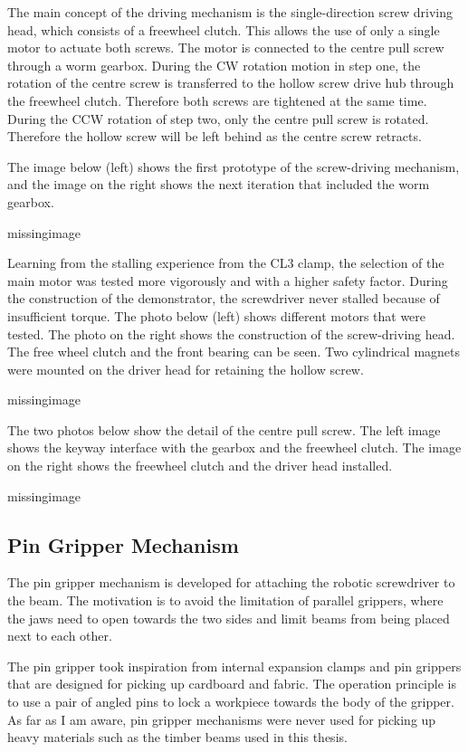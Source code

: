 The main concept of the driving mechanism is the single-direction screw driving head, which consists of a freewheel clutch. This allows the use of only a single motor to actuate both screws. The motor is connected to the centre pull screw through a worm gearbox. During the CW rotation motion in step one, the rotation of the centre screw is transferred to the hollow screw drive hub through the freewheel clutch. Therefore both screws are tightened at the same time. During the CCW rotation of step two, only the centre pull screw is rotated. Therefore the hollow screw will be left behind as the centre screw retracts.

The image below (left) shows the first prototype of the screw-driving mechanism, and the image on the right shows the next iteration that included the worm gearbox. 

missingimage

Learning from the stalling experience from the CL3 clamp, the selection of the main motor was tested more vigorously and with a higher safety factor. During the construction of the demonstrator, the screwdriver never stalled because of insufficient torque. The photo below (left) shows different motors that were tested. The photo on the right shows the construction of the screw-driving head. The free wheel clutch and the front bearing can be seen. Two cylindrical magnets were mounted on the driver head for retaining the hollow screw.

missingimage

The two photos below show the detail of the centre pull screw. The left image shows the keyway interface with the gearbox and the freewheel clutch. The image on the right shows the freewheel clutch and the driver head installed.

missingimage

\subsection{Pin Gripper Mechanism}
\label{subsection:exploration_4_pin_gripper_mechanism}

The pin gripper mechanism is developed for attaching the robotic screwdriver to the beam. The motivation is to avoid the limitation of parallel grippers, where the jaws need to open towards the two sides and limit beams from being placed next to each other. 

The pin gripper took inspiration from internal expansion clamps and pin grippers that are designed for picking up cardboard and fabric. The operation principle is to use a pair of angled pins to lock a workpiece towards the body of the gripper. As far as I am aware, pin gripper mechanisms were never used for picking up heavy materials such as the timber beams used in this thesis.

